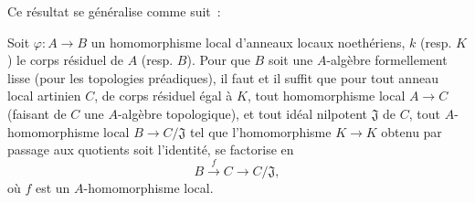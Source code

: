 
Ce résultat se généralise comme suit~:

\begin{proposition}[22.1.4]
\label{0.22.1.4-fr}
Soit $\varphi:A\to B$ un homomorphisme local d'anneaux locaux noethériens,
$k$ (resp. $K$) le corps résiduel de $A$ (resp. $B$). Pour que $B$ soit une
$A$-algèbre formellement lisse (pour les topologies préadiques), il faut et
il suffit que pour tout anneau local artinien $C$, de corps résiduel égal à
$K$, tout homomorphisme local $A\to C$ (faisant de $C$ une $A$-algèbre
topologique), et tout idéal nilpotent $\mathfrak J$ de $C$, tout
$A$-homomorphisme local $B\to C/\mathfrak J$ tel que l'homomorphisme
$K\to K$ obtenu par passage aux quotients soit l'identité, se factorise en
\[
  B\xrightarrow{f}C\longrightarrow C/\mathfrak J,
\]
où $f$ est un $A$-homomorphisme local.
\end{proposition}

